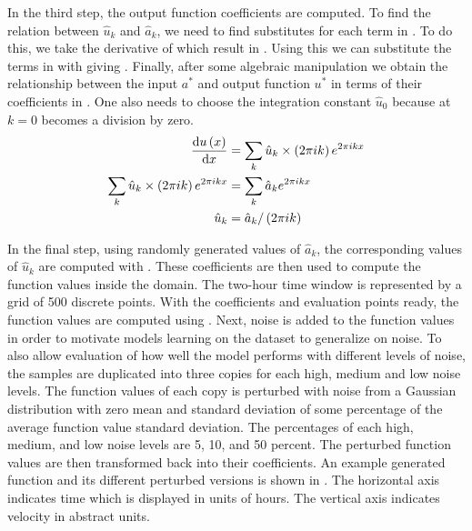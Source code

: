 In the third step, the output function coefficients are computed. To find the relation between \(\hat{u}_k \) and \(\hat{a}_k \), we need to find substitutes for each term in . To do this, we take the derivative of  which result in . Using this we can substitute the terms in  with  giving . Finally, after some algebraic manipulation we obtain the relationship between the input \(a^*\) and output function \(u^*\) in terms of their coefficients in . One also needs to choose the integration constant \(\hat{u}_{0}\) because at \(k=0\)  becomes a division by zero.
\begin{align}
  \dv{u\left( x \right)}{x}                                    & = \sum_{k} \hat{u}_k\times \left( 2\pi ik \right) e^{2\pi ikx} \label{eq:fourier_series_derivative} \\
  \sum_{k} \hat{u}_k\times \left( 2\pi ik \right) e^{2\pi ikx} & = \sum_{k} \hat{a}_k e^{2\pi ikx} \label{eq:example_spectral_method_fourier_substituted}            \\
  \hat{u}_k                                                    & = \hat{a}_k / \left( 2\pi ik \right) \label{eq:derivative_coeff}
\end{align}

In the final step, using randomly generated values of \(\hat{a}_k\), the corresponding values of \(\hat{u}_k\) are computed with . These coefficients are then used to compute the function values inside the domain. The two-hour time window is represented by a grid of \num{500} discrete points. With the coefficients and evaluation points ready, the function values are computed using . Next, noise is added to the function values in order to motivate models learning on the dataset to generalize on noise. To also allow evaluation of how well the model performs with different levels of noise, the samples are duplicated into three copies for each high, medium and low noise levels. The function values of each copy is perturbed with noise from a Gaussian distribution with zero mean and standard deviation of some percentage of the average function value standard deviation. The percentages of each high, medium, and low noise levels are 5, 10, and 50 percent. The perturbed function values are then transformed back into their coefficients. An example generated function and its different perturbed versions is shown in . The horizontal axis indicates time which is displayed in units of hours. The vertical axis indicates velocity in abstract units.

